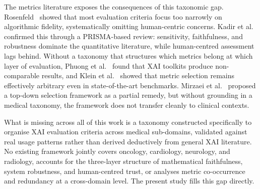 The metrics literature exposes the consequences of this taxonomic gap.
Rosenfeld~\cite{rosenfeld2021better} showed that most evaluation criteria focus
too narrowly on algorithmic fidelity, systematically omitting human-centric
concerns. Kadir et al.~\cite{kadir2023evaluation} confirmed this through a
PRISMA-based review: sensitivity, faithfulness, and robustness dominate the
quantitative literature, while human-centred assessment lags behind.
Without a taxonomy that structures which metrics belong
at which layer of evaluation, Phuong et al.~\cite{phuong2023benchmarking} found
that XAI toolkits produce non-comparable results, and Klein et
al.~\cite{Klein2024NavigatingTM} showed that metric selection remains
effectively arbitrary even in state-of-the-art benchmarks.
Mirzaei et al.~\cite{mirzaei2023xai} proposed a top-down
selection framework as a partial remedy, but without grounding in a medical
taxonomy, the framework does not transfer cleanly to clinical contexts.

What is missing across all of this work is a taxonomy constructed specifically
to organise XAI evaluation criteria across medical sub-domains, validated
against real usage patterns rather than derived deductively from general XAI
literature. No existing framework jointly covers oncology, cardiology,
neurology, and radiology, accounts for the three-layer structure of
mathematical faithfulness, system robustness, and human-centred trust, or
analyses metric co-occurrence and redundancy at a cross-domain level. The
present study fills this gap directly.
